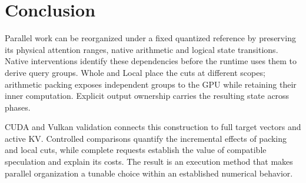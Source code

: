 \section{Conclusion}
Parallel work can be reorganized under a fixed quantized reference by preserving its physical attention ranges, native arithmetic and logical state transitions. Native interventions identify these dependencies before the runtime uses them to derive query groups. Whole and Local place the cuts at different scopes; arithmetic packing exposes independent groups to the GPU while retaining their inner computation. Explicit output ownership carries the resulting state across phases.

CUDA and Vulkan validation connects this construction to full target vectors and active KV. Controlled comparisons quantify the incremental effects of packing and local cuts, while complete requests establish the value of compatible speculation and explain its costs. The result is an execution method that makes parallel organization a tunable choice within an established numerical behavior.
